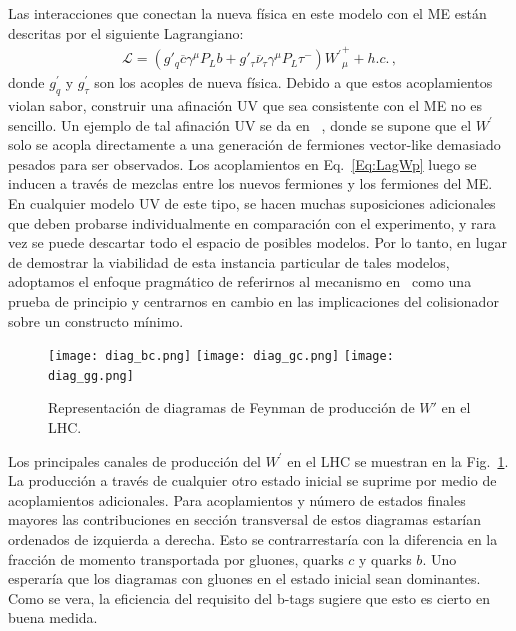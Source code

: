 Las interacciones que conectan la nueva física en este modelo con el ME están descritas por el siguiente Lagrangiano:
 \begin{align}\label{Eq:LagWp}
 \mathcal{L} = ( g'_q \overline{c}  \gamma ^{\mu} P_{L} b +g'_{\tau} \overline{\nu}_{\tau}  \gamma ^{\mu} P_{L} \tau^{-}){W^{\prime}}_{\mu}^{+} + h.c.\,,
 \end{align}
donde $g^{\prime}_{q}$ y $g^{\prime}_{\tau}$ son los acoples de nueva física. Debido a que estos acoplamientos violan sabor, construir una afinación UV que sea consistente con el ME no es sencillo. Un ejemplo de tal afinación UV se da en~\cite{Boucenna:2016qad} , donde se supone que el $W^{\prime}$ solo se acopla directamente a una generación de fermiones vector-like demasiado pesados para ser observados. Los acoplamientos en Eq.~\eqref{Eq:LagWp} luego se inducen a través de mezclas entre los nuevos fermiones y los fermiones del ME. En cualquier modelo UV de este tipo, se hacen muchas suposiciones adicionales que deben probarse individualmente en comparación con el experimento, y rara vez se puede descartar todo el espacio de posibles modelos. Por lo tanto, en lugar de demostrar la viabilidad de esta instancia particular de tales modelos, adoptamos el enfoque pragmático de referirnos al mecanismo en~\cite{Boucenna:2016wpr} como una prueba de principio y centrarnos en cambio en las implicaciones del colisionador sobre un constructo mínimo.
%
\begin{figure}
\begin{center}
\texttt{[image: diag\_bc.png]}
\texttt{[image: diag\_gc.png]}
\texttt{[image: diag\_gg.png]}
\caption{Representación de diagramas de Feynman de producción de $W'$ en el LHC.}
\label{Fig:diag}
\end{center}
\end{figure}
%

Los principales canales de producción del $W^{\prime}$ en el LHC se muestran en la Fig.~\ref{Fig:diag}. La producción a través de cualquier otro estado inicial se suprime por medio de acoplamientos adicionales. Para acoplamientos y número de estados finales mayores las contribuciones en sección transversal de estos diagramas estarían ordenados de izquierda a derecha. Esto se contrarrestaría con la diferencia en la fracción de momento transportada por gluones, quarks $c$  y quarks $b$. Uno esperaría que los diagramas con gluones en el estado inicial sean dominantes. Como se vera, la eficiencia del requisito del b-tags sugiere que esto es cierto en buena medida.

